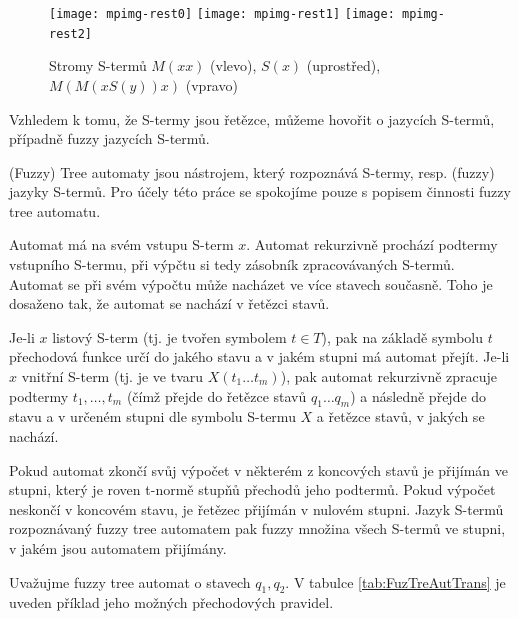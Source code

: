 \documentclass[a4paper,10pt]{article}
\begin{document}
\begin{figure}
  \centering
   \hfill
   \texttt{[image: mpimg-rest0]} 
   \hfill
   \texttt{[image: mpimg-rest1]}
   \hfill
   \texttt{[image: mpimg-rest2]}
   \hfill
 \caption{Stromy S-termů $M(xx)$ (vlevo), $S(x)$ (uprostřed), $M(M(x S(y)) x)$ (vpravo)} \label{img:Tree}
\end{figure}

Vzhledem k tomu, že S-termy jsou řetězce, můžeme hovořit o jazycích S-termů, případně fuzzy jazycích S-termů. 

(Fuzzy) Tree automaty jsou nástrojem, který rozpoznává S-termy, resp. (fuzzy) jazyky S-termů. Pro účely této práce se spokojíme pouze s popisem činnosti fuzzy tree automatu. 

Automat má na svém vstupu S-term $x$. Automat rekurzivně prochází podtermy vstupního S-termu, při výpčtu si tedy zásobník zpracovávaných S-termů. Automat se při svém výpočtu může nacházet ve více stavech současně. Toho je dosaženo tak, že automat se nachází v řetězci stavů. 

Je-li $x$ listový S-term (tj. je tvořen symbolem $t \in T$), pak na základě symbolu $t$ přechodová funkce určí do jakého stavu a v jakém stupni má automat přejít. Je-li $x$ vnitřní S-term (tj. je ve tvaru $X(t_1 \dots t_m)$), pak automat rekurzivně zpracuje podtermy $t_1, \dots, t_m$ (čímž přejde do řetězce stavů $q_1 \dots q_m$) a následně přejde do stavu a v určeném stupni dle symbolu S-termu $X$ a řetězce stavů, v jakých se nachází.

Pokud automat zkončí svůj výpočet v některém z koncových stavů je přijímán ve stupni, který je roven t-normě stupňů přechodů jeho podtermů. Pokud výpočet neskončí v koncovém stavu, je řetězec přijímán v nulovém stupni. Jazyk S-termů rozpoznávaný fuzzy tree automatem pak fuzzy množina všech S-termů ve stupni, v jakém jsou automatem přijímány.

\begin{example}
  Uvažujme fuzzy tree automat o stavech $q_1, q_2$. V tabulce \ref{tab:FuzTreAutTrans} je uveden příklad jeho možných přechodových pravidel.
\end{example}
\end{document}
